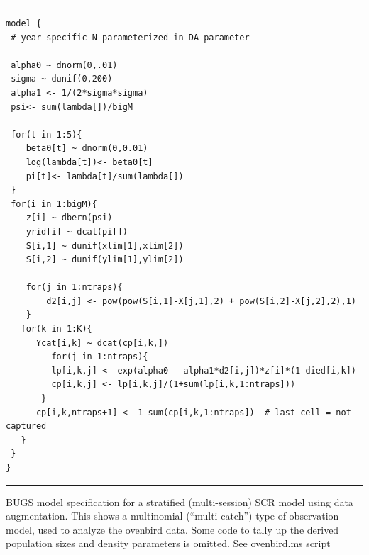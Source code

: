 \begin{panel}[htp]
\renewcommand{\baselinestretch}{1.0}
\centering
\rule[0.15in]{\textwidth}{.03in}
{\small
\begin{verbatim}
model {
 # year-specific N parameterized in DA parameter 

 alpha0 ~ dnorm(0,.01)
 sigma ~ dunif(0,200)
 alpha1 <- 1/(2*sigma*sigma)
 psi<- sum(lambda[])/bigM

 for(t in 1:5){
    beta0[t] ~ dnorm(0,0.01)   
    log(lambda[t])<- beta0[t]
    pi[t]<- lambda[t]/sum(lambda[])
 } 
 for(i in 1:bigM){
    z[i] ~ dbern(psi)
    yrid[i] ~ dcat(pi[])
    S[i,1] ~ dunif(xlim[1],xlim[2])
    S[i,2] ~ dunif(ylim[1],ylim[2])

    for(j in 1:ntraps){
        d2[i,j] <- pow(pow(S[i,1]-X[j,1],2) + pow(S[i,2]-X[j,2],2),1)
    }
   for(k in 1:K){
      Ycat[i,k] ~ dcat(cp[i,k,])
         for(j in 1:ntraps){
         lp[i,k,j] <- exp(alpha0 - alpha1*d2[i,j])*z[i]*(1-died[i,k])        
         cp[i,k,j] <- lp[i,k,j]/(1+sum(lp[i,k,1:ntraps]))
       }
      cp[i,k,ntraps+1] <- 1-sum(cp[i,k,1:ntraps])  # last cell = not captured
   }  
 } 
} 
\end{verbatim}
}
\rule[-0.15in]{\textwidth}{.03in}
\caption{BUGS model specification for a stratified (multi-session) SCR
  model using data augmentation. This shows a multinomial
  (``multi-catch'') type of observation model, used to analyze the
  ovenbird data.  Some code to tally up the derived population sizes
  and density parameters is omitted. See ovenbird.ms script }
\label{multisession.panel.ovenbird}
\end{panel}

